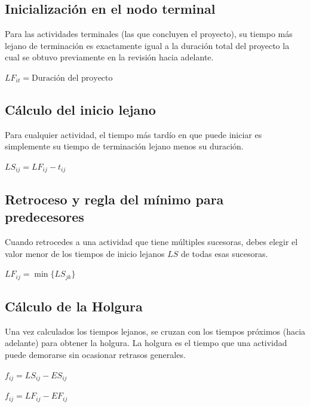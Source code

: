 \documentclass[10pt,a4paper]{article}
\begin{document}
\subsection{Inicialización en el nodo terminal}
Para las actividades terminales 
(las que concluyen el proyecto), 
su tiempo más lejano de terminación es exactamente
igual a la duración total del proyecto la cual se 
obtuvo previamente en la revisión hacia adelante.

\vspace{2mm}

$LF_{it} = \text{Duración del proyecto}$

\subsection{Cálculo del inicio lejano}
Para cualquier actividad, el tiempo más tardío en que puede iniciar es simplemente su tiempo de terminación lejano menos su duración.

\vspace{2mm}

$LS_{ij} = LF_{ij} - t_{ij}$

\subsection{Retroceso y regla del mínimo para predecesores}
Cuando retrocedes a una actividad que tiene múltiples sucesoras, debes elegir el valor menor de los tiempos de inicio lejanos $LS$ de todas esas sucesoras.

\vspace{2mm}

$LF_{ij} = \min\{LS_{jk}\}$

\subsection{Cálculo de la Holgura}

Una vez calculados los tiempos lejanos, se cruzan con los tiempos próximos (hacia adelante) para obtener la holgura. 
La holgura es el tiempo que una actividad puede demorarse sin ocasionar retrasos generales.

\vspace{2mm}

$f_{ij} = LS_{ij} - ES_{ij}$

\vspace{2mm}

$f_{ij} = LF_{ij} - EF_{ij}$

\vspace{2mm}
\end{document}
